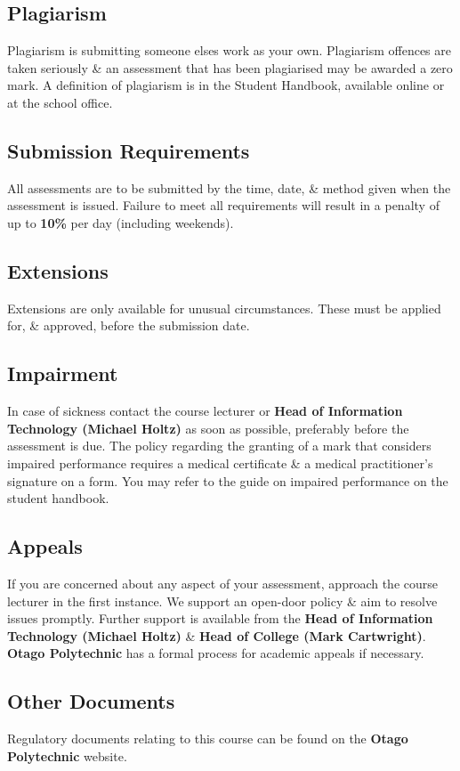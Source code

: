 \documentclass{article}
\begin{document}
\subsection*{Plagiarism}
Plagiarism is submitting someone elses work as your own. Plagiarism offences are taken seriously \& an assessment that has been plagiarised may be awarded a zero mark. A definition of plagiarism is in the Student Handbook, available online or at the school office.

\subsection*{Submission Requirements}
All assessments are to be submitted by the time, date, \& method given when the assessment is issued. Failure to meet all requirements will result in a penalty of up to \textbf{10\%} per day (including weekends).

\subsection*{Extensions}
Extensions are only available for unusual circumstances. These must be applied for, \& approved, before the submission date.

\subsection*{Impairment}
In case of sickness contact the course lecturer or \textbf{Head of Information Technology (Michael Holtz)} as soon as possible, preferably before the assessment is due. The policy regarding the granting of a mark that considers impaired performance requires a medical certificate \& a medical practitioner’s signature on a form. You may refer to the guide on impaired performance on the student handbook.

\subsection*{Appeals}
If you are concerned about any aspect of your assessment, approach the course lecturer in the first instance. We support an open-door policy \& aim to resolve issues promptly. Further support is available from the \textbf{Head of Information Technology (Michael Holtz)} \& \textbf{Head of College (Mark Cartwright)}. \textbf{Otago Polytechnic} has a formal process for academic appeals if necessary.

\subsection*{Other Documents}
Regulatory documents relating to this course can be found on the \textbf{Otago Polytechnic} website.
\end{document}
